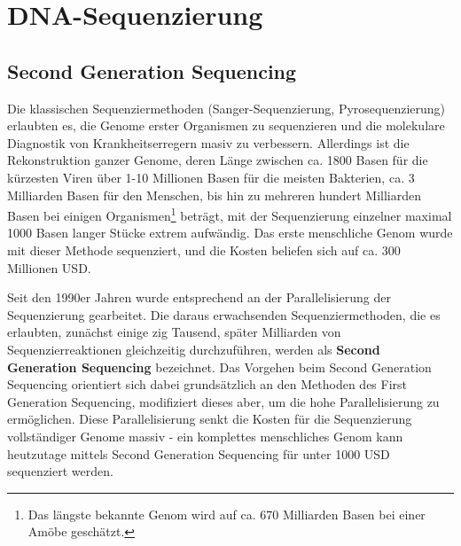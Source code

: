 \section{DNA-Sequenzierung}





\subsection{Second Generation Sequencing}

Die klassischen Sequenziermethoden (Sanger-Sequenzierung, Pyrosequenzierung) erlaubten es, die Genome erster Organismen zu sequenzieren und die molekulare Diagnostik von Krankheitserregern masiv zu verbessern. Allerdings ist die Rekonstruktion ganzer Genome, deren Länge zwischen ca. 1800 Basen für die kürzesten Viren über 1-10 Millionen Basen für die meisten Bakterien, ca. 3 Milliarden Basen für den Menschen, bis hin zu mehreren hundert Milliarden Basen bei einigen Organismen\footnote{Das längste bekannte Genom wird auf ca. 670 Milliarden Basen bei einer Amöbe geschätzt.} beträgt, mit der Sequenzierung einzelner maximal 1000 Basen langer Stücke extrem aufwändig. Das erste menschliche Genom wurde mit dieser Methode sequenziert, und die Kosten beliefen sich auf ca. 300 Millionen USD. 

Seit den 1990er Jahren wurde entsprechend an der Parallelisierung der Sequenzierung gearbeitet. Die daraus erwachsenden Sequenziermethoden, die es erlaubten, zunächst einige zig Tausend, später Milliarden von Sequenzierreaktionen gleichzeitig durchzuführen, werden als \textbf{Second Generation Sequencing} bezeichnet. Das Vorgehen beim Second Generation Sequencing orientiert sich dabei grundsätzlich an den Methoden des First Generation Sequencing, modifiziert dieses aber, um die hohe Parallelisierung zu ermöglichen. Diese Parallelisierung senkt die Kosten für die Sequenzierung vollständiger Genome massiv - ein komplettes menschliches Genom kann heutzutage mittels Second Generation Sequencing für unter 1000 USD sequenziert werden. 

